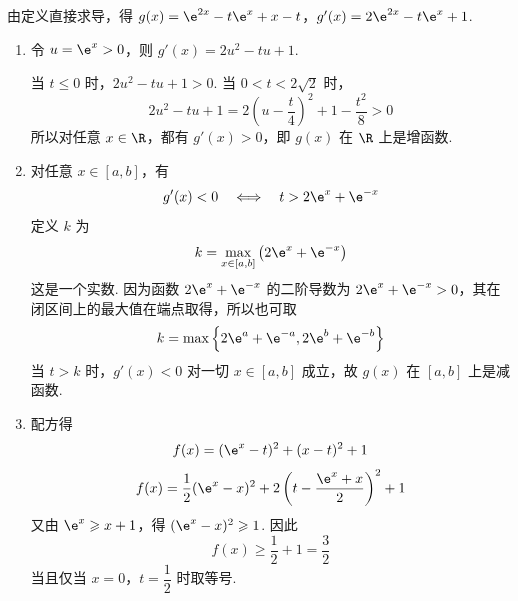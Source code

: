 \begin{solution}
由定义直接求导，得
\(g(x)=\e^{2x}-t\e^{x}+x-t\)，\(g'(x)=2\e^{2x}-t\e^{x}+1\).

\begin{enumerate}
\item 令 \(u=\e^{x}>0\)，则 \(g'(x)=2u^{2}-tu+1\).

当 \(t\leqslant0\) 时，\(2u^{2}-tu+1>0\). 当 \(0<t<2\sqrt{2}\) 时，
\[
2u^{2}-tu+1=2\left(u-\frac{t}{4}\right)^{2}+1-\frac{t^{2}}{8}>0
\]
所以对任意 \(x\in\R\)，都有 \(g'(x)>0\)，即 \(g(x)\) 在 \(\R\) 上是增函数.
\item 对任意 \(x\in[a,b]\)，有
\[
g'(x)<0\quad\Longleftrightarrow\quad t>2\e^{x}+\e^{-x}
\]
定义 \(k\) 为
\[
k=\max_{x\in[a,b]}\left(2\e^{x}+\e^{-x}\right)
\]
这是一个实数. 因为函数 \(2\e^{x}+\e^{-x}\) 的二阶导数为 \(2\e^{x}+\e^{-x}>0\)，其在闭区间上的最大值在端点取得，所以也可取
\[
k=\max\left\{2\e^{a}+\e^{-a},2\e^{b}+\e^{-b}\right\}
\]
当 \(t>k\) 时，\(g'(x)<0\) 对一切 \(x\in[a,b]\) 成立，故 \(g(x)\) 在 \([a,b]\) 上是减函数.
\item 配方得
\[
f(x)=(\e^{x}-t)^{2}+(x-t)^{2}+1
\]
\[
f(x)=\frac{1}{2}(\e^{x}-x)^{2}+2\left(t-\frac{\e^{x}+x}{2}\right)^{2}+1
\]
又由 \(\e^{x}\geqslant x+1\)，得 \((\e^{x}-x)^{2}\geqslant1\). 因此
\[
f(x)\geqslant\frac{1}{2}+1=\frac{3}{2}
\]
当且仅当 \(x=0\)，\(t=\dfrac{1}{2}\) 时取等号.
\end{enumerate}
\end{solution}
